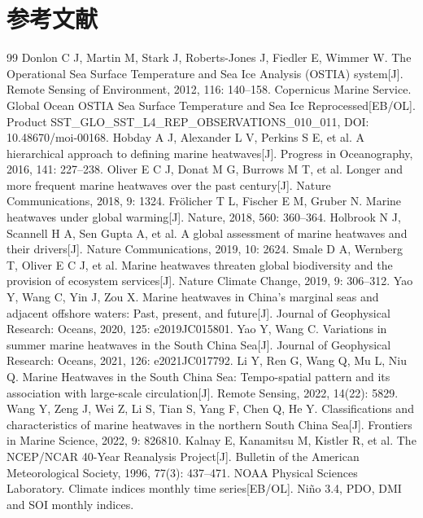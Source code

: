 \documentclass[UTF8,a4paper,zihao=-4,fontset=fandol]{ctexart}
\begin{document}
\section*{参考文献}
\begin{thebibliography}{99}
 Donlon C J, Martin M, Stark J, Roberts-Jones J, Fiedler E, Wimmer W. The Operational Sea Surface Temperature and Sea Ice Analysis (OSTIA) system[J]. Remote Sensing of Environment, 2012, 116: 140--158.
 Copernicus Marine Service. Global Ocean OSTIA Sea Surface Temperature and Sea Ice Reprocessed[EB/OL]. Product SST\_GLO\_SST\_L4\_REP\_OBSERVATIONS\_010\_011, DOI: 10.48670/moi-00168.
 Hobday A J, Alexander L V, Perkins S E, et al. A hierarchical approach to defining marine heatwaves[J]. Progress in Oceanography, 2016, 141: 227--238.
 Oliver E C J, Donat M G, Burrows M T, et al. Longer and more frequent marine heatwaves over the past century[J]. Nature Communications, 2018, 9: 1324.
 Fr{\"o}licher T L, Fischer E M, Gruber N. Marine heatwaves under global warming[J]. Nature, 2018, 560: 360--364.
 Holbrook N J, Scannell H A, Sen Gupta A, et al. A global assessment of marine heatwaves and their drivers[J]. Nature Communications, 2019, 10: 2624.
 Smale D A, Wernberg T, Oliver E C J, et al. Marine heatwaves threaten global biodiversity and the provision of ecosystem services[J]. Nature Climate Change, 2019, 9: 306--312.
 Yao Y, Wang C, Yin J, Zou X. Marine heatwaves in China's marginal seas and adjacent offshore waters: Past, present, and future[J]. Journal of Geophysical Research: Oceans, 2020, 125: e2019JC015801.
 Yao Y, Wang C. Variations in summer marine heatwaves in the South China Sea[J]. Journal of Geophysical Research: Oceans, 2021, 126: e2021JC017792.
 Li Y, Ren G, Wang Q, Mu L, Niu Q. Marine Heatwaves in the South China Sea: Tempo-spatial pattern and its association with large-scale circulation[J]. Remote Sensing, 2022, 14(22): 5829.
 Wang Y, Zeng J, Wei Z, Li S, Tian S, Yang F, Chen Q, He Y. Classifications and characteristics of marine heatwaves in the northern South China Sea[J]. Frontiers in Marine Science, 2022, 9: 826810.
 Kalnay E, Kanamitsu M, Kistler R, et al. The NCEP/NCAR 40-Year Reanalysis Project[J]. Bulletin of the American Meteorological Society, 1996, 77(3): 437--471.
 NOAA Physical Sciences Laboratory. Climate indices monthly time series[EB/OL]. Niño 3.4, PDO, DMI and SOI monthly indices.

\end{thebibliography}
\end{document}
